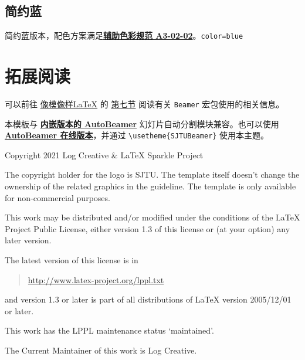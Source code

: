 \documentclass[a4paper,12pt]{article}
\begin{document}
\begin{CJK}{UTF8}{song}
\newpage
\subsection{简约蓝}

简约蓝版本，配色方案满足\href{http://vi.sjtu.edu.cn/index.php/articles/base/3}{\textbf{辅助色彩规范 A3-02-02}}。\hfill \texttt{color=blue}

\begin{tcbraster}[raster columns=3,colframe=blue,colback=white,
    colbacktitle=blue!50!white,fonttitle=\small\bfseries\ttfamily,
    left=0pt,right=0pt,top=0pt,bottom=0pt,boxsep=0pt,boxrule=0.6pt,
    toptitle=1mm,bottomtitle=1mm,drop lifted shadow,center title,
    graphics pages={1,...,12}]
\end{tcbraster}

\section{拓展阅读}
可以前往 \href{https://logcreative.github.io/LaTeXSparkle/}{像模像样\LaTeX} 的 \href{https://logcreative.github.io/LaTeXSparkle/src/art/chapter07.html}{第七节} 阅读有关 \verb"Beamer" 宏包使用的相关信息。

本模板与 \href{https://github.com/LogCreative/AutoBeamer/tree/pkg}{\textbf{内嵌版本的 \textsf{AutoBeamer}}} 幻灯片自动分割模块兼容。也可以使用 \href{https://logcreative.github.io/AutoBeamer/}{\textbf{\textsf{AutoBeamer} 在线版本}}，并通过 \verb"\usetheme{SJTUBeamer}" 使用本主题。

\scriptsize  

\newpage
Copyright 2021 Log Creative \& \LaTeX{} Sparkle Project

The copyright holder for the logo is SJTU. The template itself doesn't change the ownership of the related graphics in the guideline. The template is only available for non-commercial purposes.

This work may be distributed and/or modified under the
conditions of the \LaTeX{} Project Public License, either version 1.3 of this license or (at your option) any later version.

The latest version of this license is in
\begin{quotation}
    \href{http://www.latex-project.org/lppl.txt}{http://www.latex-project.org/lppl.txt}
\end{quotation}
and version 1.3 or later is part of all distributions of \LaTeX{}
version 2005/12/01 or later.

This work has the LPPL maintenance status `maintained'.

The Current Maintainer of this work is Log Creative.

%

\end{CJK}
\end{document}
